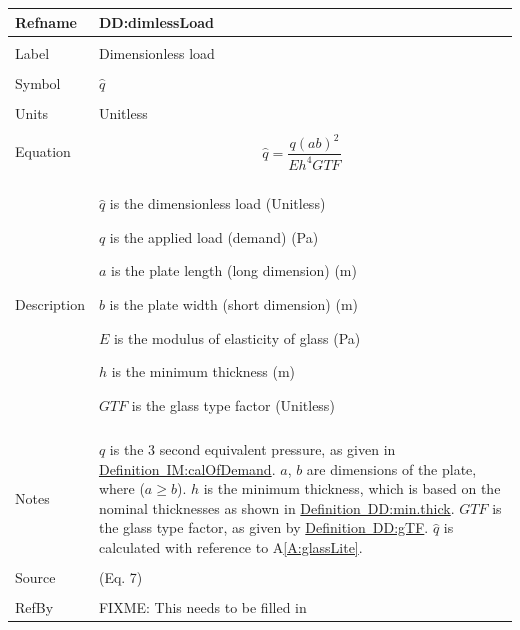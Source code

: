 \documentclass[12pt]{article}
\begin{document}
\noindent \begin{minipage}{\textwidth}
\begin{tabular}{p{} p{}}
\toprule \textbf{Refname} & \textbf{DD:dimlessLoad}
\label{DD:dimlessLoad}
\\ \midrule \\
Label & Dimensionless load
\\ \midrule \\
Symbol & $\hat{q}$
\\ \midrule \\
Units & Unitless
\\ \midrule \\
Equation & \begin{dmath}
           \hat{q}=\frac{q \left(a b\right)^{2}}{E h^{4} GTF}
           \end{dmath}
\\ \midrule \\
Description & \begin{symbDescription}
              \item{$\hat{q}$ is the dimensionless load (Unitless)}
              \item{$q$ is the applied load (demand) (Pa)}
              \item{$a$ is the plate length (long dimension) (m)}
              \item{$b$ is the plate width (short dimension) (m)}
              \item{$E$ is the modulus of elasticity of glass (Pa)}
              \item{$h$ is the minimum thickness (m)}
              \item{$GTF$ is the glass type factor (Unitless)}
              \end{symbDescription}
\\ \midrule \\
Notes & $q$ is the 3 second equivalent pressure, as given in \hyperref[IM:calOfDemand]{Definition~IM:calOfDemand}.
        $a$, $b$ are dimensions of the plate, where ($a\geq{}b$).
        $h$ is the minimum thickness, which is based on the nominal thicknesses as shown in \hyperref[DD:min.thick]{Definition~DD:min.thick}.
        $GTF$ is the glass type factor, as given by \hyperref[DD:gTF]{Definition~DD:gTF}.
        $\hat{q}$ is calculated with reference to A\ref{A:glassLite}.
\\ \midrule \\
Source & \cite{campidelli} (Eq. 7)
\\ \midrule \\
RefBy & FIXME: This needs to be filled in
\\ \bottomrule \end{tabular}
\end{minipage}\\
\end{document}
